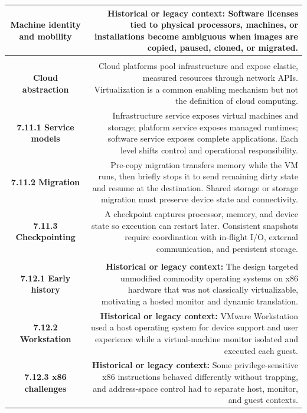 \documentclass[10pt,letterpaper]{article}
\begin{document}
\begin{longtable}{C N}
\textbf{Machine identity and mobility} & \textcolor{legacy}{\textbf{Historical or legacy context:}} Software licenses tied to physical processors, machines, or installations become ambiguous when images are copied, paused, cloned, or migrated.\\\hline
{}\\*\hline
\textbf{Cloud abstraction} & Cloud platforms pool infrastructure and expose elastic, measured resources through network APIs. Virtualization is a common enabling mechanism but not the definition of cloud computing.\\\hline
\textbf{7.11.1 Service models} & Infrastructure service exposes virtual machines and storage; platform service exposes managed runtimes; software service exposes complete applications. Each level shifts control and operational responsibility.\\\hline
\textbf{7.11.2 Migration} & Pre-copy migration transfers memory while the VM runs, then briefly stops it to send remaining dirty state and resume at the destination. Shared storage or storage migration must preserve device state and connectivity.\\\hline
\textbf{7.11.3 Checkpointing} & A checkpoint captures processor, memory, and device state so execution can restart later. Consistent snapshots require coordination with in-flight I/O, external communication, and persistent storage.\\\hline
{}\\*\hline
\textbf{7.12.1 Early history} & \textcolor{legacy}{\textbf{Historical or legacy context:}} The design targeted unmodified commodity operating systems on x86 hardware that was not classically virtualizable, motivating a hosted monitor and dynamic translation.\\\hline
\textbf{7.12.2 Workstation} & \textcolor{legacy}{\textbf{Historical or legacy context:}} VMware Workstation used a host operating system for device support and user experience while a virtual-machine monitor isolated and executed each guest.\\\hline
\textbf{7.12.3 x86 challenges} & \textcolor{legacy}{\textbf{Historical or legacy context:}} Some privilege-sensitive x86 instructions behaved differently without trapping, and address-space control had to separate host, monitor, and guest contexts.\\\hline

\end{longtable}
\end{document}
